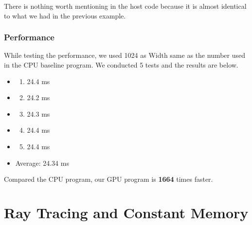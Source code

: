 \documentclass[letterpaper,10pt,english]{sphinxmanual}
\begin{document}
There is nothing worth mentioning in the host code because it is almost identical to what we had in the previous example.


\subsection{Performance}
\label{CUDA2D/CUDA2D:id4}
While testing the performance, we used 1024 as Width same as the number used in the CPU baseline program. We conducted 5 tests and the results are below.
\begin{itemize}
\item {} \begin{enumerate}
\item {} 
24.4 ms

\end{enumerate}

\item {} \begin{enumerate}
\setcounter{enumi}{1}
\item {} 
24.2 ms

\end{enumerate}

\item {} \begin{enumerate}
\setcounter{enumi}{2}
\item {} 
24.3 ms

\end{enumerate}

\item {} \begin{enumerate}
\setcounter{enumi}{3}
\item {} 
24.4 ms

\end{enumerate}

\item {} \begin{enumerate}
\setcounter{enumi}{4}
\item {} 
24.4 ms

\end{enumerate}

\item {} 
Average: 24.34 ms

\end{itemize}

Compared the CPU program, our GPU program is \textbf{1664} times faster.


\chapter{Ray Tracing and Constant Memory}
\label{RTACM/RTACM::doc}\label{RTACM/RTACM:ray-tracing-and-constant-memory}
\end{document}
